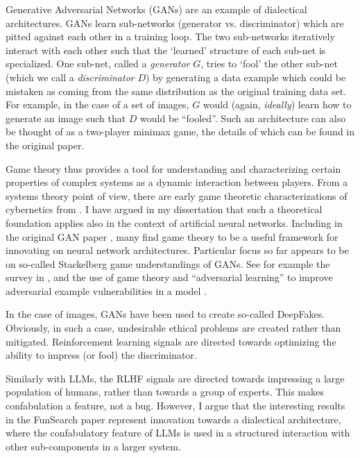 \documentclass[11pt, oneside]{article}   	%
\begin{document}
Generative Adversarial Networks (GANs) are an example of dialectical architectures.  GANs learn sub-networks (generator vs. discriminator) which are pitted against each other in a training loop.  The two sub-networks iteratively interact with each other such that the `learned' structure of each sub-net is specialized.  One sub-net, called a \emph{generator} $G$, tries to `fool' the other sub-net (which we call a \emph{discriminator} $D$) by generating a data example which could be mistaken as coming from the same distribution as the original training data set.  For example, in the case of a set of images, $G$ would (again, \emph{ideally}) learn how to generate an image such that $D$ would be ``fooled''.  Such an architecture can also be thought of as a two-player minimax game, the details of which can be found in the original paper.  \citep{GANS2014}


Game theory thus provides a tool for understanding and characterizing certain properties of complex systems as a dynamic interaction between players.  From a systems theory point of view, there are early game theoretic characterizations of cybernetics from \citep{Ashby1958}. I have argued in my dissertation that such a theoretical foundation applies also in the context of artificial neural networks.  \citep{Beebe2021}  Including in the original GAN paper \citep{GANS2014}, many find game theory to be a useful framework for innovating on neural network architectures.  Particular focus so far appears to be on so-called Stackelberg game understandings of GANs.  See for example the survey in \citep{GameTheoryDLSurvey2022}, and the use of game theory and ``adversarial learning'' to improve adversarial example vulnerabilities in a model \citep{AdversarialLearning2021}.




In the case of images, GANs have been used to create so-called DeepFakes.  Obviously, in such a case, undesirable ethical problems are created rather than mitigated.  Reinforcement learning signals are directed towards optimizing the ability to impress (or fool) the discriminator.

Similarly with LLMs, the RLHF signals are directed towards impressing a large population of humans, rather than towards a group of experts.  This makes confabulation a feature, not a bug.  However, I argue that the interesting results in the FunSearch paper represent innovation towards a dialectical architecture, where the confabulatory feature of LLMs is used in a structured interaction with other sub-components in a larger system.
\end{document}
